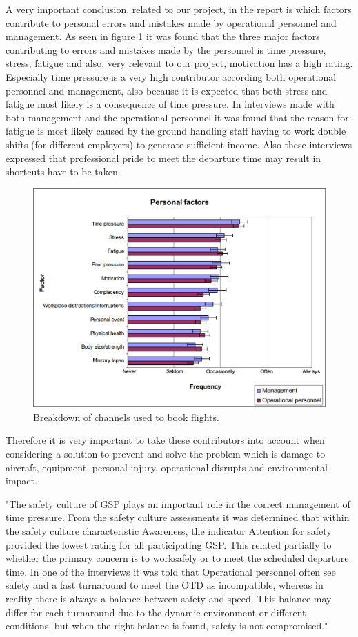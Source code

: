 A very important conclusion, related to our project, in the report is which factors contribute to personal errors and mistakes made by operational personnel and management. As seen in figure \ref{PersonalFactors} it was found that the three major factors contributing to errors and mistakes made by the personnel is time pressure, stress, fatigue and also, very relevant to our project, motivation has a high rating. Especially time pressure is a very high contributor according both operational personnel and management, also because it is expected that both stress and fatigue most likely is a consequence of time pressure. In interviews made with both management and the operational personnel it was found that the reason for fatigue is most likely caused by the ground handling staff having to work double shifts (for different employers) to generate sufficient income. Also these interviews expressed that professional pride to meet the departure time may result in shortcuts have to be taken.

\begin{figure}[!h]
\centering
\includegraphics[width=\textwidth]{Grafik/PersonalFactors}
\caption{Breakdown of channels used to book flights.}
\label{PersonalFactors}
\end{figure}

Therefore it is very important to take these contributors into account when considering a solution to prevent and solve the problem which is damage to aircraft, equipment, personal injury, operational disrupts and environmental impact.

"The safety culture of GSP plays an important role in the correct management of time pressure. From the safety culture assessments it was determined that within the safety culture characteristic Awareness, the indicator Attention for safety provided the lowest rating for all participating GSP. This related partially to whether the primary concern is to worksafely or to meet the scheduled departure time. In one of the interviews it was told that Operational personnel often see safety and a fast turnaround to meet the OTD as incompatible, whereas in reality there is always a balance between safety and speed. This balance may differ for each turnaround due to the dynamic environment or different conditions, but when the right balance is found, safety is not compromised."

